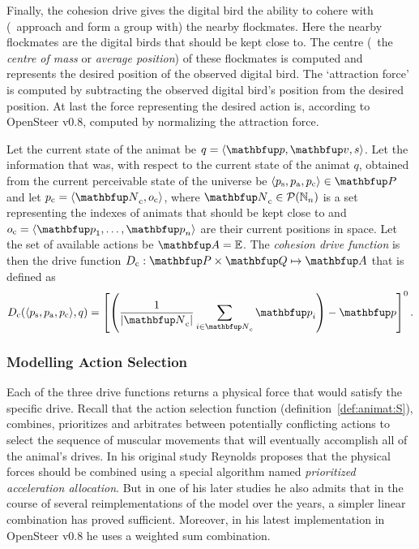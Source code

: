 Finally, the cohesion drive gives the digital bird the ability to cohere with (\ie\ approach and form a group with) the nearby flockmates. Here the nearby flockmates are the digital birds that should be kept close to. The centre (\ie\ the \emph{centre of mass} or \emph{average position}) of these flockmates is computed and represents the desired position of the observed digital bird. The `attraction force' is computed by subtracting the observed digital bird's position from the desired position. At last the force representing the desired action is, according to OpenSteer v0.8, computed by normalizing the attraction force.

\begin{definition}
\label{def:animat:Dc:cwr}
Let the current state of the animat be $q=\langle\vect{p},\vect{v},s\rangle$. Let the information that was, with respect to the current state of the animat $q$, obtained from the current perceivable state of the universe be $\langle p_\textnormal{s},p_\textnormal{a},p_\textnormal{c}\rangle \in \set{P}$ and let $p_\textnormal{c}=\langle\set{N}_\textnormal{c},o_\textnormal{c}\rangle$, where $\set{N}_\textnormal{c} \in \powset{\N_n}$ is a set representing the indexes of animats that should be kept close to and $o_\textnormal{c}=\langle\vect{p}_1,\ldots,\vect{p}_n\rangle$ are their current positions in space. Let the set of available actions be $\set{A}=\E$. The \emph{cohesion drive function} is then the drive function $D_\textnormal{c}: \set{P} \times \set{Q} \mapsto \set{A}$ that is defined as 
\begin{equation}
D_\textnormal{c}(\langle p_\textnormal{s},p_\textnormal{a},p_\textnormal{c}\rangle, q) = \left[ \left( \frac{1}{\left|\set{N}_\textnormal{c}\right|} \sum_{i \in \set{N}_\textnormal{c}} \vect{p}_i \right) - \vect{p} \right]^0. \label{eq:animat:Dc:cwr}
\end{equation}
\end{definition}

\subsubsection{Modelling Action Selection}
Each of the three drive functions returns a physical force that would satisfy the specific drive. Recall that the action selection function (definition~\ref{def:animat:S}), combines, prioritizes and arbitrates between potentially conflicting actions to select the sequence of muscular mo\-ve\-ments that will eventually accomplish all of the animal's drives. In his original study Reynolds \cite{reynolds:1987} proposes that the physical forces should be combined using a special algorithm named \emph{prioritized acceleration allocation}. But in one of his later studies \cite{reynolds:1999} he also admits that in the course of several reimplementations of the model over the years, a simpler linear combination has proved sufficient. Moreover, in his latest implementation in OpenSteer v0.8 he uses a weighted sum combination. 

